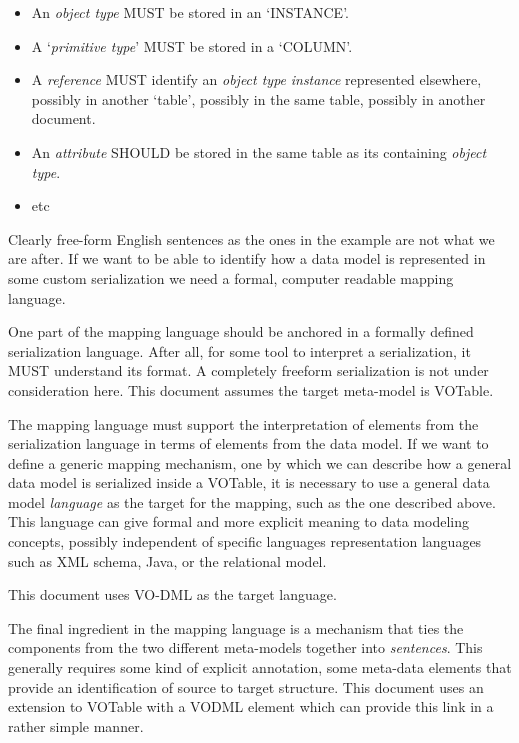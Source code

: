 \documentclass[11pt,a4paper]{ivoa}
\begin{document}
\begin{itemize}
\item
  An \emph{object type} MUST be stored in an `INSTANCE'.
\item
  A `\emph{primitive type}' MUST be stored in a `COLUMN'.
\item
  A \emph{reference} MUST identify an \emph{object type} \emph{instance}
  represented elsewhere, possibly in another `table', possibly in the
  same table, possibly in another document.
\item
  An \emph{attribute} SHOULD be stored in the same table as its
  containing \emph{object type}.
\item
  etc
\end{itemize}

Clearly free-form English sentences as the ones in the example are not
what we are after. If we want to be able to identify how a data model is
represented in some custom serialization we need a formal, computer
readable mapping language.

One part of the mapping language should be anchored in a formally
defined serialization language. After all, for some tool to interpret a
serialization, it MUST understand its format. A completely freeform
serialization is not under consideration here. This document assumes the
target meta-model is VOTable.

The mapping language must support the interpretation of elements from
the serialization language in terms of elements from the data model. If
we want to define a generic mapping mechanism, one by which we can
describe how a general data model is serialized inside a VOTable, it is
necessary to use a general data model \emph{language} as the target for
the mapping, such as the one described above. This language can give
formal and more explicit meaning to data modeling concepts, possibly
independent of specific languages representation languages such as XML
schema, Java, or the relational model.

This document uses VO-DML as the target language.

The final ingredient in the mapping language is a mechanism that ties
the components from the two different meta-models together into
\emph{sentences}. This generally requires some kind of explicit
annotation, some meta-data elements that provide an identification of
source to target structure. This document uses an extension to VOTable
with a VODML element which can provide this link in a rather simple
manner.
\end{document}
